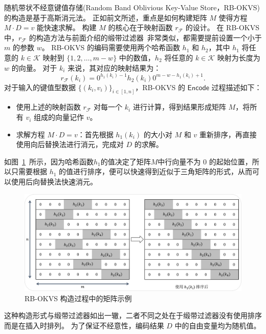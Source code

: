 随机带状不经意键值存储(Random Band Oblivious Key-Value Store，RB-OKVS)的构造是基于高斯消元法。
正如前文所述，重点是如何构建矩阵 $M$ 使得方程 $M\cdot D = v$ 能快速求解。
构建 $M$ 的核心在于映射函数 $r_{\mathcal{F}}$ 的设计。
在 RB-OKVS 中，$r_{\mathcal{F}}$ 的构造方法与前面介绍的缎带过滤器~\cite{dillinger2021ribbon}非常类似，都需要提前设置一个小于 $m$ 的参数 $w$。
RB-OKVS 的编码需要使用两个哈希函数 $h_1$ 和 $h_2$，其中 $h_1$ 将任意的 $k\in \mathcal{K}$ 映射到 $\{1, 2, \ldots, m-w\}$ 中的数值，$h_2$ 将任意的 $k\in \mathcal{K}$ 映射为长度为 $w$ 的向量。
对于 $k_i$ 来说，其对应的映射结果为：
\begin{equation}
  r_{\mathcal{F}}(k_i) = 0^{h_1(k_i) - 1}h_2(k_i)0^{m - w - h_1(k_i) + 1}.
\end{equation}
对于输入的键值型数据 $\{(k_i, v_i)\}_{i\in[1,n]}$，RB-OKVS 的 $\mathsf{Encode}$ 过程描述如下：
\begin{itemize}
  \item 使用上述的映射函数 $r_{\mathcal{F}}$ 对每一个 $k_i$ 进行计算，得到结果形成矩阵 $M$，将所有 $v_i$ 组成的向量记作 $v$。
  \item 求解方程 $M\cdot D = v$：首先根据 $h_1(k_i)$ 的大小对 $M$ 和 $v$ 重新排序，再直接使用向后替换法进行消元，完成对 $D$ 的求解。
\end{itemize}
如图~\ref{fig:rbokvs_example}~所示，因为哈希函数$h_1$的值决定了矩阵$M$中行向量不为 $0$ 的起始位置，所以只需要根据 $h_1$ 的值进行排序，便可以快速得到近似于三角矩阵的形式，从而可以使用后向替换法快速消元。
\begin{figure}[ht]
  \centering
  \includegraphics[width=\textwidth]{figures/rbokvs_exp.pdf}
  \caption{RB-OKVS 构造过程中的矩阵示例}
  \label{fig:rbokvs_example}
\end{figure}
这种构造形式与缎带过滤器如出一辙，二者不同之处在于缎带过滤器没有使用排序而是在插入时排列。
为了保证不经意性，编码结果 $D$ 中的自由变量均为随机值。


